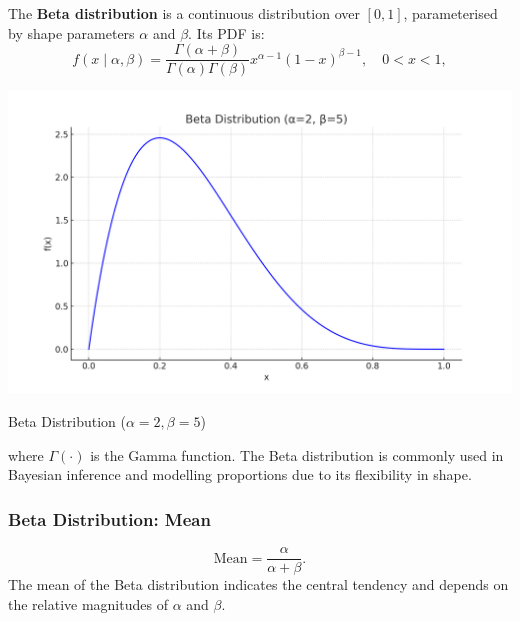 The \textbf{Beta distribution} is a continuous distribution over $[0, 1]$, parameterised by shape parameters $\alpha$ and $\beta$. Its PDF is:
\[
    f(x \mid \alpha, \beta) = \frac{\Gamma(\alpha + \beta)}{\Gamma(\alpha) \Gamma(\beta)} x^{\alpha - 1} (1 - x)^{\beta - 1}, \quad 0 < x < 1,
\]
\begin{marginfigure}
    \includegraphics[width=\linewidth]{img/beta_distribution.png}
    \caption{Beta Distribution ($\alpha=2, \beta=5$)}
    \label{fig:beta}
\end{marginfigure}
where $\Gamma(\cdot)$ is the Gamma function. The Beta distribution is commonly used in Bayesian inference and modelling proportions due to its flexibility in shape.


\subsubsection{Beta Distribution: Mean}
\[
    \text{Mean} = \frac{\alpha}{\alpha + \beta}.
\]
The mean of the Beta distribution indicates the central tendency and depends on the relative magnitudes of \(\alpha\) and \(\beta\).

